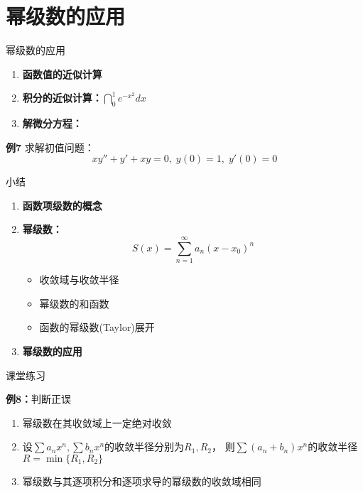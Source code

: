 \section{幂级数的应用}

\begin{frame}{幂级数的应用}
	\linespread{1.2}\pause 
	\begin{enumerate}
	  \item {\bf 函数值的近似计算}\pause 
	  \item {\bf 积分的近似计算：}\pause $\dint_0^1e^{-x^2}dx$\pause 
	  \item {\bf 解微分方程：}\pause 
	\end{enumerate}
	\begin{exampleblock}{{\bf 例7}\hfill}
		求解初值问题：
		$$xy''+y'+xy=0,\;y(0)=1,\;y'(0)=0$$
	\end{exampleblock}
\end{frame}

\begin{frame}[<+->]{小结}
	\linespread{1.2}
	\begin{enumerate}
	  \item {\bf 函数项级数的概念}
	  \item {\bf 幂级数：}
	  $$S(x)=\sum\limits_{n=1}^{\infty}a_n(x-x_0)^n$$
	  \begin{itemize}
	    \item 收敛域与收敛半径
	    \item 幂级数的和函数
	    \item 函数的幂级数(Taylor)展开
	  \end{itemize}
	  \item {\bf 幂级数的应用}
	\end{enumerate}
\end{frame}

\begin{frame}{课堂练习}
	\linespread{1.5}
	\begin{exampleblock}{{\bf 例8：}判断正误\hfill}
		\begin{enumerate}
		  \item 幂级数在其收敛域上一定绝对收敛\pause \;{\alert{$(\;\times\;)$}}\pause 
		  \item 设$\sum a_nx^n,\sum b_nx^n$的收敛半径分别为$R_1,R_2$，
		  则$\sum(a_n+b_n)x^n$的收敛半径$R=\min\{R_1,R_2\}$\pause 
		  \;{\alert{$(\;\times\;)$}}\pause 
		  \item 幂级数与其逐项积分和逐项求导的幂级数的收敛域相同\pause 
		  \;{\alert{$(\;\times\;)$}}
		\end{enumerate}
	\end{exampleblock}
\end{frame}

